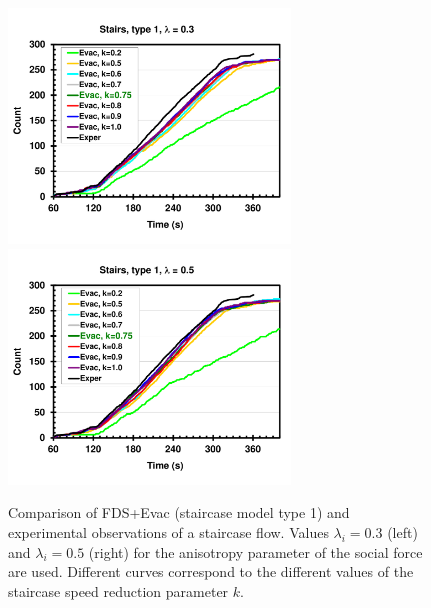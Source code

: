 \documentclass[12pt,a4paper,final,twoside]{stylevk}
\begin{document}
\begin{enumerate}
%
\begin{figure}[!tb]
  \centerline{\includegraphics[clip=true,
    width=75mm]{FIGURES/OfficeStairs_Exper_vs_Evac_Type1_L0p3}\includegraphics[clip=true,
    width=75mm]{FIGURES/OfficeStairs_Exper_vs_Evac_Type1_L0p5}}
  \caption{Comparison of FDS+Evac (staircase model type 1) and experimental
    observations of a staircase flow.  Values $\lambda_i=0.3$ (left)
    and $\lambda_i=0.5$ (right) for the anisotropy parameter of the
    social force are used.  Different curves correspond to the
    different values of the staircase speed reduction parameter
    $k$.}\label{Fig_StairType1}
\end{figure}
%


\end{enumerate}
\end{document}
